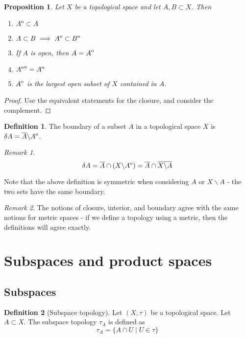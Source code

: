 \documentclass{article}
\theoremstyle{definition}
\newtheorem{defn}{Definition}[section]
\theoremstyle{plain}%
\newtheorem{prop}[thm]{Proposition}
\theoremstyle{remark}
\newtheorem*{rem}{Remark}
\newcommand{\intersection}{\cap}
\newcommand{\interior}[1]{%
  {\kern0pt#1}^{\mathrm{o}}%
}
\begin{document}
\begin{prop}
    Let $X$ be a topological space and let $A, B \subset X$. Then
    \begin{enumerate}
        \item $\interior{A} \subset A$
        \item $A \subset B \implies \interior{A} \subset \interior{B}$
        \item If $A$ is open, then $A = \interior{A}$
        \item $\interior{\interior{A}} = \interior{A}$
        \item $\interior{A}$ is the largest open subset of $X$ contained in $A$.
    \end{enumerate}
\end{prop}

\begin{proof}
    Use the equivalent statements for the closure, and consider the complement.
\end{proof}

\begin{defn}
    The boundary of a subset $A$ in a topological space $X$ is $\delta A = \overline{A} \backslash \interior{A}$.
\end{defn}

\begin{rem}
    \[\delta A = \overline{A} \intersection (X \backslash \interior{A}) = \overline{A} \intersection \overline{X \backslash A}\]

    Note that the above definition is symmetric when considering $A$ or $X \backslash A$ - the two sets have the same boundary.
\end{rem}

\begin{rem}
    The notions of closure, interior, and boundary agree with the same notions for metric spaces - if we define a topology using a metric, then the definitions will agree exactly.
\end{rem}

\section{Subspaces and product spaces}

\subsection{Subspaces}

\begin{defn}[Subspace topology]
    Let $(X, \tau)$ be a topological space. Let $A \subset X$. The subspace topology $\tau_A$ is defined as 
    \[ \tau_A = \{ A \intersection U \mid U \in \tau \} \]
\end{defn}
\end{document}

